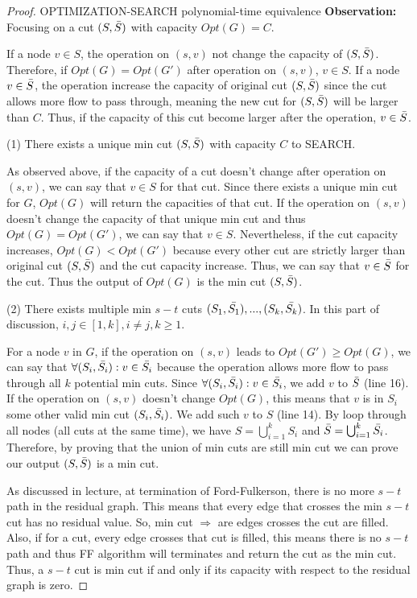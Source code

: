 \documentclass[openany]{article}
\begin{document}
\begin{proof}{}{OPTIMIZATION-SEARCH polynomial-time equivalence}
\textbf{Observation:} Focusing on a cut $(S,\Bar{S})$ with capacity $Opt(G) = C$.

If a node $v\in S$, the operation on $(s,v)$ not change the capacity of $(S,\Bar{S})$. Therefore, if $Opt(G) = Opt(G')$ after operation on $(s,v)$, $v \in S$. If a node $v \in \Bar{S}$, the operation increase the capacity of original cut $(S,\Bar{S})$ since the cut allows more flow to pass through, meaning the new cut for $(S,\Bar{S})$ will be larger than $C$. Thus, if the capacity of this cut become larger after the operation, $v \in \Bar{S}$.

(1) There exists a unique min cut $(S,\Bar{S})$ with capacity $C$ to SEARCH.

As observed above, if the capacity of a cut doesn't change after operation on $(s,v)$, we can say that $v\in S$ for that cut. Since there exists a unique min cut for $G$, $Opt(G)$ will return the capacities of that cut. If the operation on $(s,v)$ doesn't change the capacity of that unique min cut and thus $Opt(G) = Opt(G')$, we can say that $v\in S$. Nevertheless, if the cut capacity increases, $Opt(G) < Opt(G')$ because every other cut are strictly larger than original cut $(S,\Bar{S})$ and the cut capacity increase. Thus, we can say that $v \in \Bar{S}$ for the cut. Thus the output of $Opt(G)$ is the min cut $(S,\Bar{S})$.

(2) There exists multiple min $s-t$ cuts $(S_1,\Bar{S_1}), ... , (S_k,\Bar{S_k})$. In this part of discussion, $i,j \in [1,k], i\neq j, k \geqslant 1$. 

For a node $v$ in $G$, if the operation on $(s,v)$ leads to $Opt(G') \geqslant Opt(G)$, we can say that $\forall (S_i, \Bar{S_i}): v \in \Bar{S_i}$ because the operation allows more flow to pass through all $k$ potential min cuts. Since $\forall (S_i, \Bar{S_i}): v\in \Bar{S_i}$, we add $v$ to $\Bar{S}$ (line 16). If the operation on $(s,v)$ doesn't change $Opt(G)$, this means that $v$ is in $S_i$ some other valid min cut $(S_i,\Bar{S_i})$. We add such $v$ to $S$ (line 14). By loop through all nodes (all cuts at the same time), we have $S = \bigcup_{i=1}^{k}S_i$ and $\Bar{S} = \bigcup_{i=1}^{k}\Bar{S_i}$. Therefore, by proving that the union of min cuts are still min cut we can prove our output $(S,\Bar{S})$ is a min cut.

As discussed in lecture, at termination of Ford-Fulkerson, there is no more $s-t$ path in the residual graph. This means that every edge that crosses the min $s-t$ cut has no residual value. So, min cut $\Rightarrow$ are edges crosses the cut are filled. Also, if for a cut, every edge crosses that cut is filled, this means there is no $s-t$ path and thus FF algorithm will terminates and return the cut as the min cut. Thus, a $s-t$ cut is min cut if and only if its capacity with respect to the residual graph is zero.


\end{proof}
\end{document}

